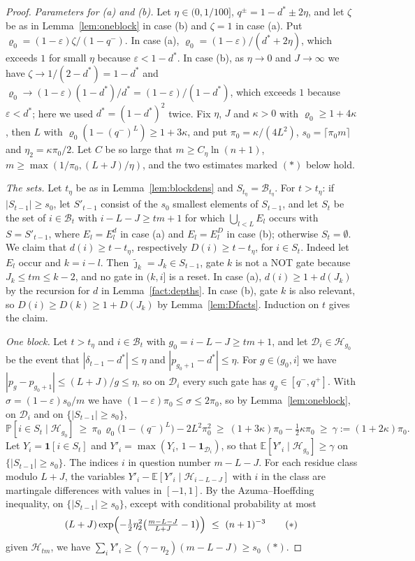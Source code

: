 \documentclass[11pt]{amsart}
\theoremstyle{definition}
\theoremstyle{remark}
\newcommand{\eps}{\varepsilon}
\newcommand{\jt}{\tilde{\jmath}}
\newcommand{\PP}{\mathbb{P}}
\newcommand{\EE}{\mathbb{E}}
\begin{document}
\begin{proof}
\emph{Parameters for (a) and (b).} Let $\eta\in(0,1/100]$, $q^\pm=1-d^*\pm2\eta$, and let $\zeta$ be
as in Lemma~\ref{lem:oneblock} in case (b) and $\zeta=1$ in case (a). Put
$\varrho_0=(1-\eps)\zeta/(1-q^-)$. In case (a), $\varrho_0=(1-\eps)/(d^*+2\eta)$, which exceeds $1$
for small $\eta$ because $\eps<1-d^*$. In case (b), as $\eta\to0$ and $J\to\infty$ we have
$\zeta\to1/(2-d^*)=1-d^*$ and $\varrho_0\to(1-\eps)(1-d^*)/d^*=(1-\eps)/(1-d^*)$, which exceeds
$1$ because $\eps<d^*$; here we used $d^*=(1-d^*)^2$ twice. Fix $\eta$, $J$ and $\kappa>0$ with
$\varrho_0\ge1+4\kappa$, then $L$ with $\varrho_0(1-(q^-)^L)\ge1+3\kappa$, and put
$\pi_0=\kappa/(4L^2)$, $s_0=\lceil\pi_0m\rceil$ and $\eta_2=\kappa\pi_0/2$. Let $C$ be so large that
$m\ge C_\eta\ln(n+1)$, $m\ge\max(1/\pi_0,(L+J)/\eta)$, and the two estimates marked $(\ast)$ below
hold.

\emph{The sets.} Let $t_\eta$ be as in Lemma~\ref{lem:blockdens} and $S_{t_\eta}=\mathcal B_{t_\eta}$.
For $t>t_\eta$: if $|S_{t-1}|\ge s_0$, let $S'_{t-1}$ consist of the $s_0$ smallest elements of
$S_{t-1}$, and let $S_t$ be the set of $i\in\mathcal B_t$ with $i-L-J\ge tm+1$ for which
$\bigcup_{l<L}E_l$ occurs with $S=S'_{t-1}$, where $E_l=E^{d}_l$ in case (a) and $E_l=E^{D}_l$ in
case (b); otherwise $S_t=\emptyset$. We claim that $d(i)\ge t-t_\eta$, respectively
$D(i)\ge t-t_\eta$, for $i\in S_t$. Indeed let $E_l$ occur and $k=i-l$. Then $\jt_k=J_k\in S_{t-1}$,
gate $k$ is not a NOT gate because $J_k\le tm\le k-2$, and no gate in $(k,i]$ is a reset. In case
(a), $d(i)\ge1+d(J_k)$ by the recursion for $d$ in Lemma~\ref{fact:depths}. In case (b), gate $k$ is
also relevant, so $D(i)\ge D(k)\ge1+D(J_k)$ by Lemma~\ref{lem:Dfacts}. Induction on $t$ gives the
claim.

\emph{One block.} Let $t>t_\eta$ and $i\in\mathcal B_t$ with $g_0=i-L-J\ge tm+1$, and let
$\mathcal D_i\in\mathcal H_{g_0}$ be the event that $|\delta_{t-1}-d^*|\le\eta$ and
$|p_{g_0+1}-d^*|\le\eta$. For $g\in(g_0,i]$ we have $|p_g-p_{g_0+1}|\le(L+J)/g\le\eta$, so on
$\mathcal D_i$ every such gate has $q_g\in[q^-,q^+]$. With $\sigma=(1-\eps)s_0/m$ we have
$(1-\eps)\pi_0\le\sigma\le2\pi_0$, so by Lemma~\ref{lem:oneblock}, on $\mathcal D_i$ and on
$\{|S_{t-1}|\ge s_0\}$,
\[
\PP[i\in S_t\mid\mathcal H_{g_0}]\ \ge\ \pi_0\,\varrho_0\bigl(1-(q^-)^L\bigr)-2L^2\pi_0^2
\ \ge\ (1+3\kappa)\pi_0-\tfrac12\kappa\pi_0\ \ge\ \gamma:=(1+2\kappa)\pi_0 .
\]
Let $Y_i=\mathbf 1[i\in S_t]$ and $Y'_i=\max(Y_i,\,1-\mathbf 1_{\mathcal D_i})$, so that
$\EE[Y'_i\mid\mathcal H_{g_0}]\ge\gamma$ on $\{|S_{t-1}|\ge s_0\}$. The indices $i$ in question
number $m-L-J$. For each residue class modulo $L+J$, the variables $Y'_i-\EE[Y'_i\mid\mathcal H_{i-L-J}]$
with $i$ in the class are martingale differences with values in $[-1,1]$. By the Azuma--Hoeffding
inequality, on $\{|S_{t-1}|\ge s_0\}$, except with conditional probability at most
\[
(L+J)\exp\Bigl(-\tfrac12\eta_2^2\bigl(\tfrac{m-L-J}{L+J}-1\bigr)\Bigr)\ \le\ (n+1)^{-3}\qquad(\ast)
\]
given $\mathcal H_{tm}$, we have
$\sum_iY'_i\ge(\gamma-\eta_2)(m-L-J)\ge s_0$ $(\ast)$.


\end{proof}
\end{document}
